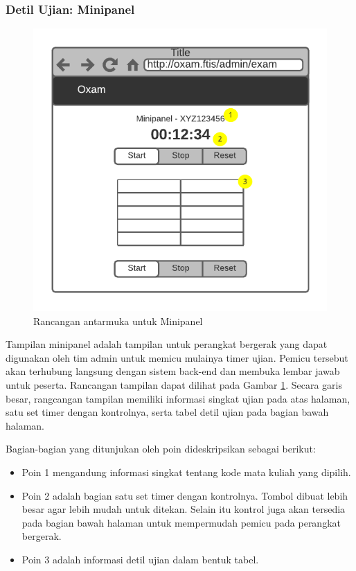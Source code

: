 \subsubsection{Detil Ujian: Minipanel}
    \begin{figure}
        \centering
        \includegraphics{Gambar/mockups/Mockup--Admin - Minipanel.pdf}
        \caption{Rancangan antarmuka untuk Minipanel}
        \label{fig:mockup_admin_minipanel}
    \end{figure}
    Tampilan minipanel adalah tampilan untuk perangkat bergerak yang dapat
    digunakan oleh tim admin untuk memicu mulainya timer ujian. Pemicu tersebut
    akan terhubung langsung dengan sistem back-end dan membuka lembar jawab
    untuk peserta. Rancangan tampilan dapat dilihat pada Gambar
    \ref{fig:mockup_admin_minipanel}. Secara garis besar, rangcangan tampilan
    memiliki informasi singkat ujian pada atas halaman, satu set timer dengan
    kontrolnya, serta tabel detil ujian pada bagian bawah halaman.
    
    Bagian-bagian yang ditunjukan oleh poin dideskripsikan sebagai berikut:
    \begin{itemize}
        \item Poin 1 mengandung informasi singkat tentang kode mata kuliah yang
        dipilih.
        
        \item Poin 2 adalah bagian satu set timer dengan kontrolnya. Tombol
            dibuat lebih besar agar lebih mudah untuk ditekan. Selain itu
            kontrol juga akan tersedia pada bagian bawah halaman untuk
            mempermudah pemicu pada perangkat bergerak.
            
        \item Poin 3 adalah informasi detil ujian dalam bentuk tabel.
    \end{itemize}
    
